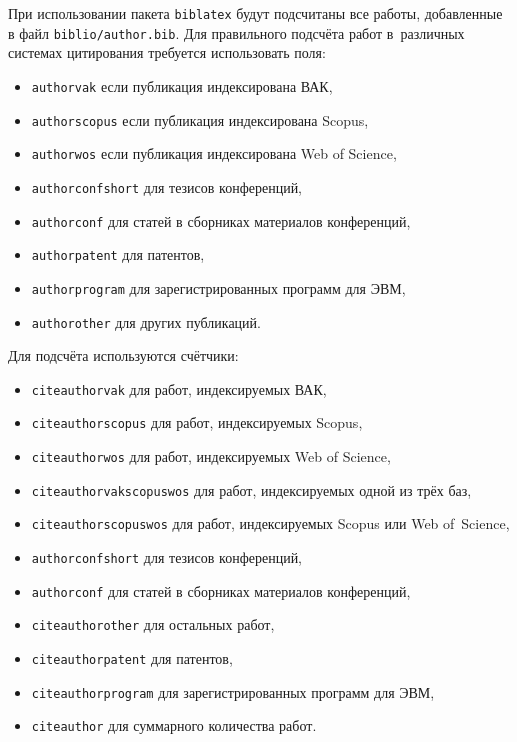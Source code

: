 При использовании пакета \verb!biblatex! будут подсчитаны все работы, добавленные
в файл \verb!biblio/author.bib!. Для правильного подсчёта работ в~различных
системах цитирования требуется использовать поля:
\begin{itemize}
	\item \texttt{authorvak} если публикация индексирована ВАК,
	\item \texttt{authorscopus} если публикация индексирована Scopus,
	\item \texttt{authorwos} если публикация индексирована Web of Science,
	\item \texttt{authorconfshort} для тезисов конференций,
	\item \texttt{authorconf} для статей в сборниках материалов конференций,
	\item \texttt{authorpatent} для патентов,
	\item \texttt{authorprogram} для зарегистрированных программ для ЭВМ,
	\item \texttt{authorother} для других публикаций.
\end{itemize}
Для подсчёта используются счётчики:
\begin{itemize}
	\item \texttt{citeauthorvak} для работ, индексируемых ВАК,
	\item \texttt{citeauthorscopus} для работ, индексируемых Scopus,
	\item \texttt{citeauthorwos} для работ, индексируемых Web of Science,
	\item \texttt{citeauthorvakscopuswos} для работ, индексируемых одной из трёх баз,
	\item \texttt{citeauthorscopuswos} для работ, индексируемых Scopus или Web of~Science,
	\item \texttt{authorconfshort} для тезисов конференций,
	\item \texttt{authorconf} для статей в сборниках материалов конференций,
	\item \texttt{citeauthorother} для остальных работ,
	\item \texttt{citeauthorpatent} для патентов,
	\item \texttt{citeauthorprogram} для зарегистрированных программ для ЭВМ,
	\item \texttt{citeauthor} для суммарного количества работ.
\end{itemize}

